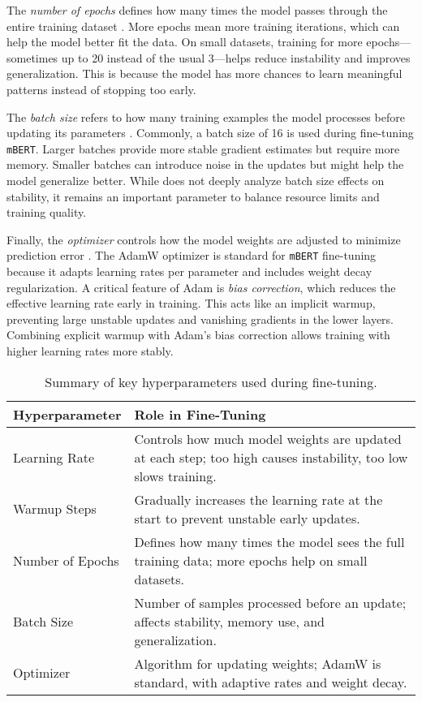     The \textit{number of epochs} defines how many times the model passes through the entire training dataset \parencite{mosbachStabilityFinetuningBERT2021}. More epochs mean more training iterations, which can help the model better fit the data. On small datasets, training for more epochs—sometimes up to 20 instead of the usual 3—helps reduce instability and improves generalization. This is because the model has more chances to learn meaningful patterns instead of stopping too early.

    The \textit{batch size} refers to how many training examples the model processes before updating its parameters \parencite{mosbachStabilityFinetuningBERT2021}. Commonly, a batch size of 16 is used during fine-tuning \texttt{mBERT}. Larger batches provide more stable gradient estimates but require more memory. Smaller batches can introduce noise in the updates but might help the model generalize better. While \textcite{mosbachStabilityFinetuningBERT2021} does not deeply analyze batch size effects on stability, it remains an important parameter to balance resource limits and training quality.

    Finally, the \textit{optimizer} controls how the model weights are adjusted to minimize prediction error \parencite{mosbachStabilityFinetuningBERT2021}. The AdamW optimizer is standard for \texttt{mBERT} fine-tuning because it adapts learning rates per parameter and includes weight decay regularization. A critical feature of Adam is \textit{bias correction}, which reduces the effective learning rate early in training. This acts like an implicit warmup, preventing large unstable updates and vanishing gradients in the lower layers. Combining explicit warmup with Adam’s bias correction allows training with higher learning rates more stably.

    \vspace{0.6em}
    \begin{table}[h]
        \centering
        \begin{tabularx}{\textwidth}{l X}
        \toprule
        \textbf{Hyperparameter} & \textbf{Role in Fine-Tuning} \\
        \midrule
        Learning Rate & Controls how much model weights are updated at each step; too high causes instability, too low slows training. \\
        Warmup Steps & Gradually increases the learning rate at the start to prevent unstable early updates. \\
        Number of Epochs & Defines how many times the model sees the full training data; more epochs help on small datasets. \\
        Batch Size & Number of samples processed before an update; affects stability, memory use, and generalization. \\
        Optimizer & Algorithm for updating weights; AdamW is standard, with adaptive rates and weight decay. \\
        \bottomrule
        \end{tabularx}
        \caption{Summary of key hyperparameters used during fine-tuning.}
    \end{table}


